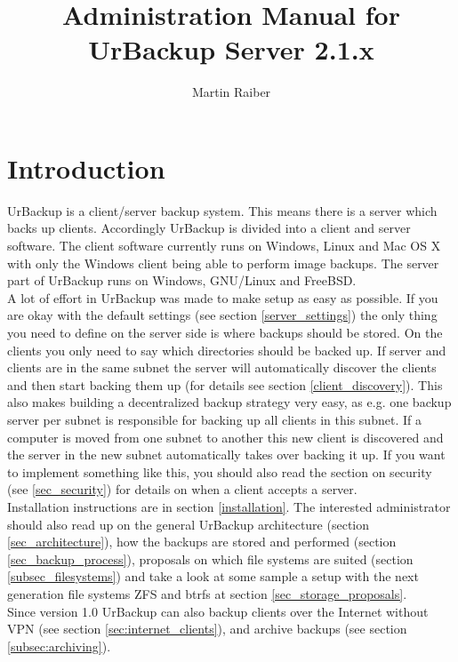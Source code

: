 \documentclass[a4paper,10pt]{article}
\begin{document}

\author{Martin Raiber}
\title{Administration Manual for\\UrBackup Server 2.1.x}

\maketitle

\tableofcontents

\newpage

\section{Introduction}

UrBackup is a client/server backup system. This means there is a server
which backs up clients. Accordingly UrBackup is divided into a client and server
software.
The client software currently runs on Windows, Linux and Mac OS X with only
the Windows client being able to perform image backups. 
The server part of UrBackup runs on Windows, GNU/Linux and FreeBSD.\\
A lot of effort in UrBackup was made to make setup as easy as possible. If you
are okay with the default settings (see section \ref{server_settings}) the only
thing you need to define on the server side is where backups should be stored.
On the clients you only need to say which directories should be backed up. If
server and clients are in the same subnet the server will automatically discover
the clients and then start backing them up (for details see section
\ref{client_discovery}). This also makes building a decentralized backup
strategy very easy, as e.g. one backup server per subnet is responsible for
backing up all clients in this subnet. If a computer is moved from one subnet to
another this new client is discovered and the server in the new subnet
automatically takes over backing it up. If you want to implement something like
this, you should also read the section on security (see \ref{sec_security}) for
details on when a client accepts a server.\\
Installation instructions are in section \ref{installation}.
The interested administrator should also read up on the general UrBackup architecture
(section \ref{sec_architecture}), how the backups are stored and performed
(section \ref{sec_backup_process}), proposals on which file systems are suited
(section \ref{subsec_filesystems}) and take a look at some sample a setup with
the next generation file systems ZFS and btrfs at section \ref{sec_storage_proposals}.\\
Since version 1.0 UrBackup can also backup clients over the Internet without VPN (see section
\ref{sec:internet_clients}), and archive backups (see section \ref{subsec:archiving}).
\end{document}

